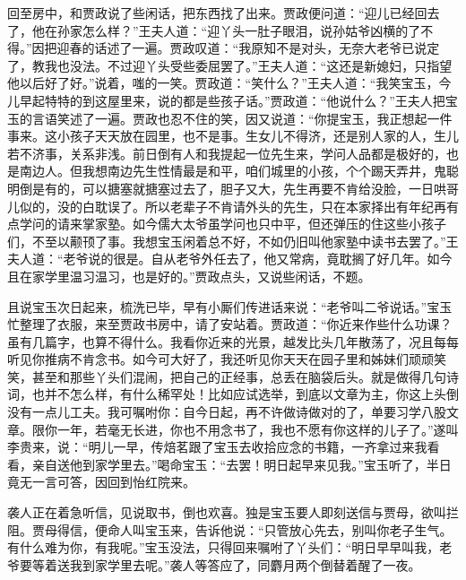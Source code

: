 \begin{parag}
\end{parag}


\begin{parag}
    回至房中，和贾政说了些闲话，把东西找了出来。贾政便问道：“迎儿已经回去了，他在孙家怎么样？”王夫人道：“迎丫头一肚子眼泪，说孙姑爷凶横的了不得。”因把迎春的话述了一遍。贾政叹道：“我原知不是对头，无奈大老爷已说定了，教我也没法。不过迎丫头受些委屈罢了。”王夫人道：“这还是新媳妇，只指望他以后好了好。”说着，嗤的一笑。贾政道：“笑什么？”王夫人道：“我笑宝玉，今儿早起特特的到这屋里来，说的都是些孩子话。”贾政道：“他说什么？”王夫人把宝玉的言语笑述了一遍。贾政也忍不住的笑，因又说道：“你提宝玉，我正想起一件事来。这小孩子天天放在园里，也不是事。生女儿不得济，还是别人家的人，生儿若不济事，关系非浅。前日倒有人和我提起一位先生来，学问人品都是极好的，也是南边人。但我想南边先生性情最是和平，咱们城里的小孩，个个踢天弄井，鬼聪明倒是有的，可以搪塞就搪塞过去了，胆子又大，先生再要不肯给没脸，一日哄哥儿似的，没的白耽误了。所以老辈子不肯请外头的先生，只在本家择出有年纪再有点学问的请来掌家塾。如今儒大太爷虽学问也只中平，但还弹压的住这些小孩子们，不至以颟顸了事。我想宝玉闲着总不好，不如仍旧叫他家塾中读书去罢了。”王夫人道：“老爷说的很是。自从老爷外任去了，他又常病，竟耽搁了好几年。如今且在家学里温习温习，也是好的。”贾政点头，又说些闲话，不题。
\end{parag}


\begin{parag}
    且说宝玉次日起来，梳洗已毕，早有小厮们传进话来说：“老爷叫二爷说话。”宝玉忙整理了衣服，来至贾政书房中，请了安站着。贾政道：“你近来作些什么功课？虽有几篇字，也算不得什么。我看你近来的光景，越发比头几年散荡了，况且每每听见你推病不肯念书。如今可大好了，我还听见你天天在园子里和姊妹们顽顽笑笑，甚至和那些丫头们混闹，把自己的正经事，总丢在脑袋后头。就是做得几句诗词，也并不怎么样，有什么稀罕处！比如应试选举，到底以文章为主，你这上头倒没有一点儿工夫。我可嘱咐你：自今日起，再不许做诗做对的了，单要习学八股文章。限你一年，若毫无长进，你也不用念书了，我也不愿有你这样的儿子了。”遂叫李贵来，说：“明儿一早，传焙茗跟了宝玉去收拾应念的书籍，一齐拿过来我看看，亲自送他到家学里去。”喝命宝玉：“去罢！明日起早来见我。”宝玉听了，半日竟无一言可答，因回到怡红院来。
\end{parag}


\begin{parag}
    袭人正在着急听信，见说取书，倒也欢喜。独是宝玉要人即刻送信与贾母，欲叫拦阻。贾母得信，便命人叫宝玉来，告诉他说：“只管放心先去，别叫你老子生气。有什么难为你，有我呢。”宝玉没法，只得回来嘱咐了丫头们：“明日早早叫我，老爷要等着送我到家学里去呢。”袭人等答应了，同麝月两个倒替着醒了一夜。
\end{parag}



